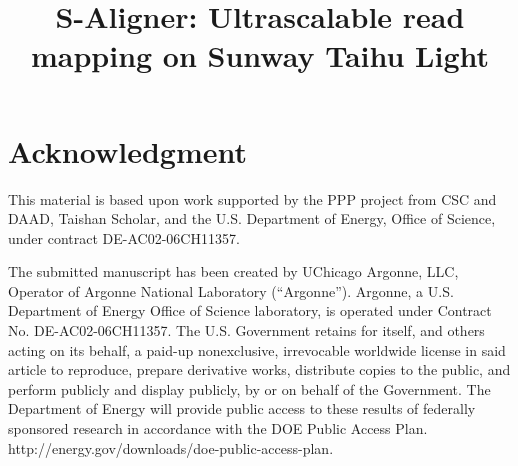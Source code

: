 \documentclass[conference]{IEEEtran}
\begin{document}
\title{S-Aligner: Ultrascalable read mapping on Sunway Taihu Light}

\author{
\and
{}
\and
{}
\and
{}
}

\maketitle



\IEEEpeerreviewmaketitle







\section*{Acknowledgment}
This material is based upon work supported by the PPP project from CSC and DAAD, 
Taishan Scholar, and the U.S. Department of Energy, Office of Science, under contract 
DE-AC02-06CH11357.




\vspace{20pt} \footnotesize{The submitted manuscript has been created
  by UChicago Argonne, LLC, Operator of Argonne National Laboratory
  (``Argonne'').  Argonne, a U.S. Department of Energy Office of
  Science laboratory, is operated under Contract
  No. DE-AC02-06CH11357. The U.S. Government retains for itself, and
  others acting on its behalf, a paid-up nonexclusive, irrevocable
  worldwide license in said article to reproduce, prepare derivative
  works, distribute copies to the public, and perform publicly and
  display publicly, by or on behalf of the Government.  The Department
  of Energy will provide public access to these results of federally
  sponsored research in accordance with the DOE Public Access
  Plan. http://energy.gov/downloads/doe-public-access-plan.}
\end{document}
